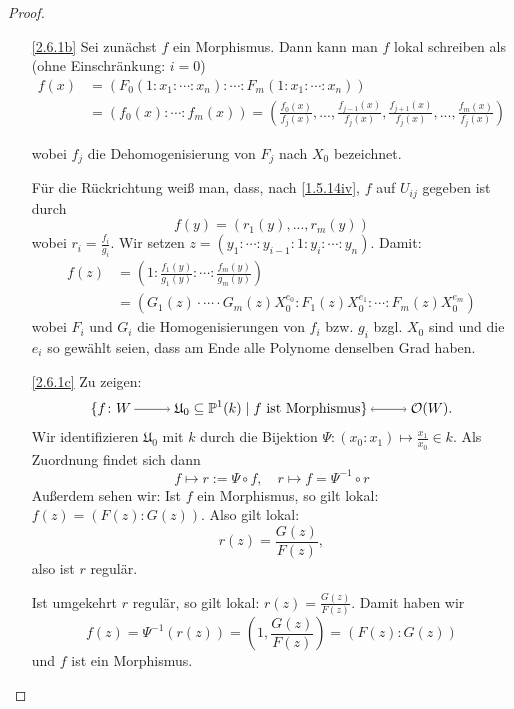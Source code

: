 \documentclass[a4paper,12pt,index=toc]{scrbook}
\theoremstyle{keinenummern} %
\def\O{\mathcal{O}}
\def\P{\mathbb{P}}
\def\U{\mathfrak{U}}
\renewcommand{\dotsc}{\ensuremath{\!...}}
\begin{document}
\begin{proof}
  \begin{enumerate}
  \item[\ref{2.6.1b}] Sei zunächst $f$ ein Morphismus. Dann kann man $f$ lokal schreiben als (ohne Einschränkung: $i=0$)
\begin{align*}f(x)&=(F_0(1:x_1:\dotsm:x_n):\dotsm:F_m(1:x_1:\dotsm:x_n))\\
&=(f_0(x):\dotsm :f_m(x))=\left(\frac {f_0(x)}{f_j(x)},\dotsc,\frac{f_{j-1}(x)}{f_j(x)},\frac{f_{j+1}(x)}{f_j(x)},\dotsc,\frac {f_m(x)}{f_j(x)}\right)\end{align*}

wobei $f_j$ die Dehomogenisierung von $F_j$ nach $X_0$ bezeichnet.

Für die Rückrichtung weiß man, dass, nach \cref{1.5.14iv}, $f$ auf $U_{ij}$ gegeben ist durch 
\begin{equation*}f(y)=(r_1(y),\dotsc,r_m(y))\end{equation*}
wobei $r_i=\frac{f_i}{g_i}$. Wir setzen $z=(y_1:\dotsm:y_{i-1}:1:y_i:\dotsm :y_n)$. Damit:
\begin{align*} f(z)&=\left(1:\frac{f_1(y)}{g_1(y)}:\dotsm :\frac{f_m(y)}{g_m(y)}\right)\\&=(G_1(z)\cdot\dotsm\cdot G_m(z)X_0^{e_0}:F_1(z)X_0^{e_1}: \dotsm :F_m(z)X_0^{e_m})\end{align*}
wobei $F_i$ und $G_i$ die Homogenisierungen von $f_i$ bzw. $g_i$ bzgl. $X_0$ sind und die $e_i$ so gewählt seien, dass am Ende alle Polynome denselben Grad haben.  
  \item[\ref{2.6.1c}] Zu zeigen:
\begin{equation*}\{f\colon W\ra \U_0\subseteq \P^1(k) \mid f \text{ ist Morphismus}\} \lra \O(W).\end{equation*}
Wir identifizieren $\U_0$ mit $k$ durch die Bijektion $\Psi \colon (x_0:x_1)\mapsto \frac{x_1}{x_0} \in k$. Als Zuordnung findet sich dann
\begin{equation*}f\mapsto r:=\Psi \circ f, \quad r\mapsto f=\Psi^{-1}\circ r\end{equation*}
Außerdem sehen wir: Ist $f$ ein Morphismus, so gilt lokal: $f(z)=(F(z):G(z))$. Also gilt lokal: \begin{equation*}r(z)=\frac{G(z)}{F(z)},\end{equation*} also ist $r$ regulär.

Ist umgekehrt $r$ regulär, so gilt lokal: $r(z)=\frac{G(z)}{F(z)}$. Damit haben wir 
\begin{equation*}f(z)=\Psi^{-1}(r(z))=(1,\frac{G(z)}{F(z)})=(F(z):G(z))\end{equation*}
und $f$ ist ein Morphismus.


\end{enumerate}
\end{proof}
\end{document}
